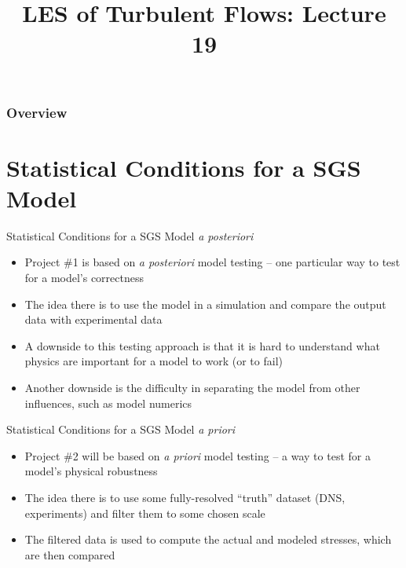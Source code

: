 
\title{LES of Turbulent Flows: Lecture 19}



\begin{frame} 
  \titlepage
\end{frame}


\begin{frame}
\frametitle{Overview}
\tableofcontents
\end{frame}

\section{Statistical Conditions for a SGS Model} %
\begin{frame}{Statistical Conditions for a SGS Model}
\textit{a posteriori}
\begin{itemize}
	\item Project \#1 is based on \textit{a posteriori} model testing -- one particular way to test for a model's correctness
	\item The idea there is to use the model in a simulation and compare the output data with experimental data
	\item A downside to this testing approach is that it is hard to understand what physics are important for a model to work (or to fail)
	\item Another downside is the difficulty in separating the model from other influences, such as model numerics
\end{itemize}
\end{frame}
\begin{frame}{Statistical Conditions for a SGS Model}
\textit{a priori}
\begin{itemize}
	\item Project \#2 will be based on \textit{a priori} model testing -- a way to test for a model's physical robustness
	\item The idea there is to use some fully-resolved ``truth'' dataset (DNS, experiments) and filter them to some chosen scale
	\item The filtered data is used to compute the actual and modeled stresses, which are then compared
\end{itemize}
\end{frame}
